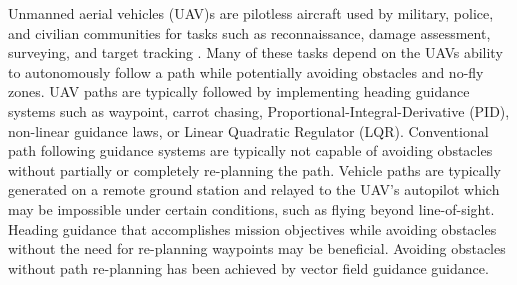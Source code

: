 \documentclass[numbered,pdftex]{ohio-etd}
\begin{document}

Unmanned aerial vehicles (UAV)s are pilotless aircraft used by military, police, and civilian communities for tasks such as reconnaissance, damage assessment, surveying, and target tracking \cite{ariyur_autonomous_2008,teuliere_chasing_2011}. Many of these tasks depend on the UAVs ability to autonomously follow a path while potentially avoiding obstacles and no-fly zones. UAV paths are typically followed by implementing heading guidance systems such as waypoint, carrot chasing, Proportional-Integral-Derivative (PID), non-linear guidance laws, or Linear Quadratic Regulator (LQR). Conventional path following guidance systems are typically not capable of avoiding obstacles without partially or completely re-planning the path. Vehicle paths are typically generated on a remote ground station and relayed to the UAV’s autopilot which may be impossible under certain conditions, such as flying beyond line-of-sight. Heading guidance that accomplishes mission objectives while avoiding obstacles without the need for re-planning waypoints may be beneficial. Avoiding obstacles without path re-planning has been achieved by vector field guidance \cite{frew_cooperative_2007,griffiths_vector_2006,goncalves_artificial_2009,goncalves_circulation_2010,goncalves_vector_2010} guidance.\\
\end{document}
